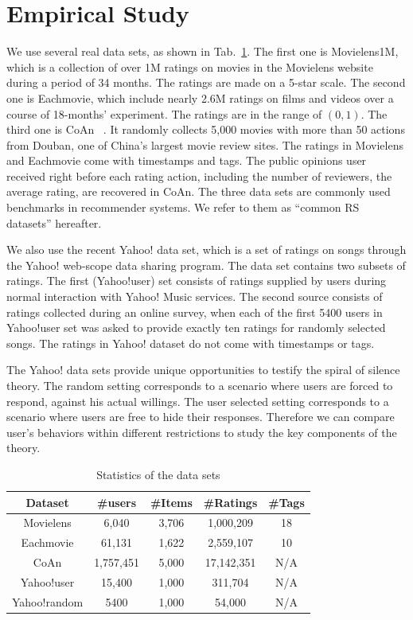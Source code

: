 \documentclass[sigconf]{acmart}
\begin{document}
\section{Empirical Study}\label{sec:empirical}
We use several real data sets, as shown in Tab.~\ref{tab:statistics}. The first one is Movielens1M, which is a collection of over 1M ratings on movies in the Movielens website during a period of 34 months. The ratings are made on a 5-star scale. The second one is Eachmovie, which include nearly 2.6M ratings on films and videos over a course of 18-months' experiment. The  ratings are in the range of $(0,1)$. The third one is CoAn ~\cite{Liu2016Are}. It randomly collects 5,000 movies with more than 50 actions from Douban, one of China's largest movie review sites. The ratings in Movielens and Eachmovie come with timestamps and tags. The public opinions user received right before each rating action, including the number of reviewers, the average rating, are recovered in CoAn. The three data sets are commonly used benchmarks in recommender systems. We refer to them as ``common RS datasets'' hereafter.

We also use the recent Yahoo! data set, which is a set of ratings on songs through the Yahoo! web-scope data sharing program. The data set contains two subsets of ratings. The first (Yahoo!user) set consists of ratings supplied by users during normal interaction with Yahoo! Music services. The second source consists of ratings collected during an online survey, when each of the first 5400 users in Yahoo!user set was asked to provide exactly ten ratings for randomly selected songs. The ratings in Yahoo! dataset do not come with timestamps or tags.

The Yahoo! data sets provide unique opportunities to testify the spiral of silence theory.  The random setting corresponds to a scenario where users are forced to respond, against his actual willings. The user selected setting corresponds to a scenario where users are free to hide their responses. Therefore we can compare user's behaviors within different restrictions to study the key components of the theory.
\begin{table}[htbp]
\centering
\small
\caption{Statistics of the data sets}\label{tab:statistics}
\begin{tabular}{|c|c|c|c|c|}
\hline
Dataset &\#users & \#Items & \#Ratings  & \#Tags\\\hline\hline
Movielens & 6,040 & 3,706 & 1,000,209 &18 \\\hline
Eachmovie & 61,131 & 1,622 & 2,559,107 &10 \\\hline
CoAn &1,757,451 & 5,000& 17,142,351 &  N/A\\\hline
Yahoo!user & 15,400 & 1,000 & 311,704 & N/A\\\hline
Yahoo!random & 5400 &  1,000 & 54,000 & N/A\\
\hline
\end{tabular}
\end{table}
\end{document}
